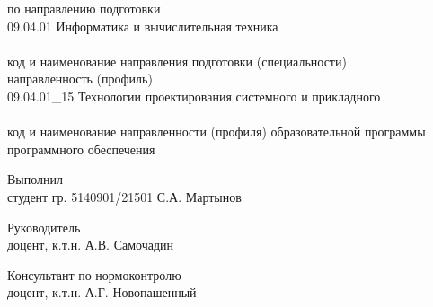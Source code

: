 \begin{titlepage}
\begin{center}
\begin{flushleft}
	по направлению подготовки\\
	09.04.01 Информатика и вычислительная техника\\
	[-0.75cm]\underline{\hspace{17.0cm}}\\
	[-0.40cm] \hspace{3.0cm} {\small код и наименование направления подготовки (специальности)} \\
	направленность (профиль)\\
	09.04.01\_15 Технологии проектирования системного и прикладного\\
	[-0.75cm]\underline{\hspace{17.0cm}}\\
	[-0.40cm] \hspace{2.0cm} {\small код и наименование направленности (профиля) образовательной программы}\\
	программного обеспечения\\
	[-0.75cm]\underline{\hspace{17.0cm}}
\end{flushleft}


\begin{flushleft}
    Выполнил\\студент гр. 5140901/21501 \hspace{3.0cm} \underline{\hspace{3cm}} \hspace{0.7cm} {С.А. Мартынов} %

    Руководитель\\ доцент, к.т.н. \hspace{5.8cm} \underline{\hspace{3cm}} \hspace{0.7cm} {А.В. Самочадин} %

    Консультант по нормоконтролю\\ доцент, к.т.н. \hspace{5.8cm} \underline{\hspace{3cm}} \hspace{0.7cm} {А.Г. Новопашенный} %
\end{flushleft}

\vspace{0.3cm}


\end{center}
\end{titlepage}
